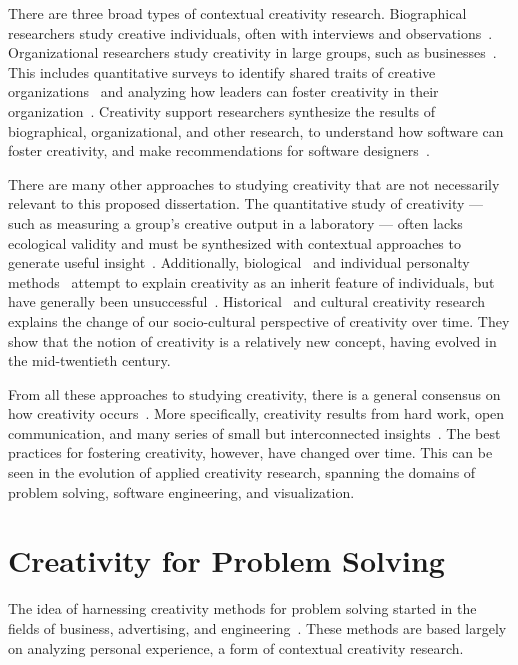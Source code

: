 There are three broad types of contextual creativity research. Biographical researchers study creative individuals, often with interviews and observations~\cite{Csikszentmihalyi1997}.  Organizational researchers study creativity in large groups, such as businesses~\cite{Drucker1988}. This includes quantitative surveys to identify shared traits of creative organizations~\cite{Isaksen2000} and analyzing how leaders can foster creativity in their organization~\cite{Amabile2008}. Creativity support researchers synthesize the results of biographical, organizational, and other research, to understand how software can foster creativity, and make recommendations for software designers~\cite{Shneiderman2005}.

There are many other approaches to studying creativity that are not necessarily relevant to this proposed dissertation. The quantitative study of creativity --- such as measuring a group's creative output in a laboratory --- often lacks ecological validity and must be synthesized with contextual approaches to generate useful insight~\cite{Sawyer2006}. Additionally, biological~\cite{Martindale1999} and individual personalty methods~\cite{Plucker1999} attempt to explain creativity as an inherit feature of individuals, but have generally been unsuccessful~\cite{Sawyer2006}. Historical~\cite{Albert1999} and cultural creativity research ~\cite{Lubart1999} explains the change of our socio-cultural perspective of creativity over time. They show that the notion of creativity is a relatively new concept, having evolved in the mid-twentieth century.

From all these approaches to studying creativity, there is a general consensus on how creativity occurs~\cite{Mayer1999}. More specifically, creativity results from hard work, open communication, and many series of small but interconnected insights~\cite{Sawyer2006}. The best practices for fostering creativity, however, have changed over time. This can be seen in the evolution of applied creativity research, spanning the domains of problem solving, software engineering, and visualization. 

\section{Creativity for Problem Solving}

The idea of harnessing creativity methods for problem solving started in the fields of business, advertising, and engineering~\cite{Osborn1953}. These methods are based largely on analyzing personal experience, a form of contextual creativity research.

